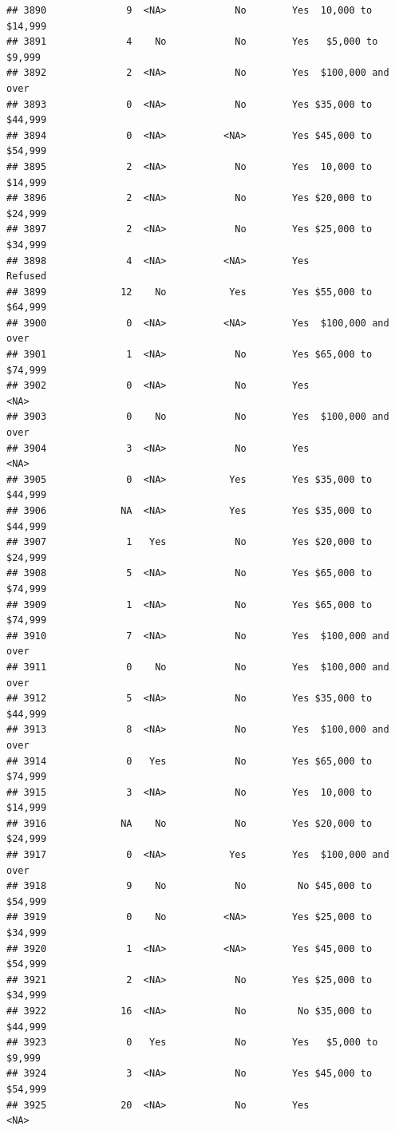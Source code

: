 \documentclass[man]{apa6}
\begin{document}
\begin{verbatim}
## 3890              9  <NA>            No        Yes  10,000 to $14,999
## 3891              4    No            No        Yes   $5,000 to $9,999
## 3892              2  <NA>            No        Yes  $100,000 and over
## 3893              0  <NA>            No        Yes $35,000 to $44,999
## 3894              0  <NA>          <NA>        Yes $45,000 to $54,999
## 3895              2  <NA>            No        Yes  10,000 to $14,999
## 3896              2  <NA>            No        Yes $20,000 to $24,999
## 3897              2  <NA>            No        Yes $25,000 to $34,999
## 3898              4  <NA>          <NA>        Yes            Refused
## 3899             12    No           Yes        Yes $55,000 to $64,999
## 3900              0  <NA>          <NA>        Yes  $100,000 and over
## 3901              1  <NA>            No        Yes $65,000 to $74,999
## 3902              0  <NA>            No        Yes               <NA>
## 3903              0    No            No        Yes  $100,000 and over
## 3904              3  <NA>            No        Yes               <NA>
## 3905              0  <NA>           Yes        Yes $35,000 to $44,999
## 3906             NA  <NA>           Yes        Yes $35,000 to $44,999
## 3907              1   Yes            No        Yes $20,000 to $24,999
## 3908              5  <NA>            No        Yes $65,000 to $74,999
## 3909              1  <NA>            No        Yes $65,000 to $74,999
## 3910              7  <NA>            No        Yes  $100,000 and over
## 3911              0    No            No        Yes  $100,000 and over
## 3912              5  <NA>            No        Yes $35,000 to $44,999
## 3913              8  <NA>            No        Yes  $100,000 and over
## 3914              0   Yes            No        Yes $65,000 to $74,999
## 3915              3  <NA>            No        Yes  10,000 to $14,999
## 3916             NA    No            No        Yes $20,000 to $24,999
## 3917              0  <NA>           Yes        Yes  $100,000 and over
## 3918              9    No            No         No $45,000 to $54,999
## 3919              0    No          <NA>        Yes $25,000 to $34,999
## 3920              1  <NA>          <NA>        Yes $45,000 to $54,999
## 3921              2  <NA>            No        Yes $25,000 to $34,999
## 3922             16  <NA>            No         No $35,000 to $44,999
## 3923              0   Yes            No        Yes   $5,000 to $9,999
## 3924              3  <NA>            No        Yes $45,000 to $54,999
## 3925             20  <NA>            No        Yes               <NA>

\end{verbatim}
\end{document}
